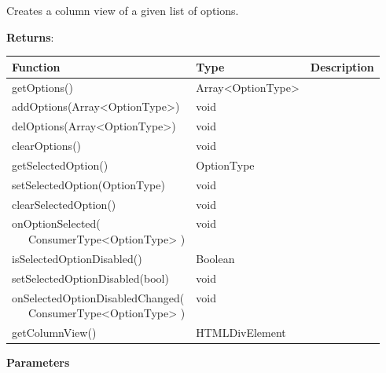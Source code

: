 \vspace*{6pt}
Creates a column view of a given list of options. 

\vspace*{18pt}
\noindent
\textbf{Returns}: 

\begin{table}[!htb] 
    \label{api:columnOptionsComponentReturn}
    \footnotesize
    \setlength\extrarowheight{4pt}
    \begin{tabular}{ p{5cm} p{3cm} p{5cm} }
        \toprule[1.2pt]
        \textbf{Function}                   & \textbf{Type}     & \textbf{Description} \\
        \midrule
        getOptions()                        & Array<OptionType> &  \\
        addOptions(Array<OptionType>)       & void              &  \\
        delOptions(Array<OptionType>)       & void              &  \\
        clearOptions()                      & void              &  \\
        getSelectedOption()                 & OptionType        &  \\
        setSelectedOption(OptionType)       & void              &  \\
        clearSelectedOption()               & void              &  \\
        \tbbr{
            onOptionSelected( \\
                \ \ \ ConsumerType<OptionType>
            )}                              & void              &  \\
        isSelectedOptionDisabled()          & Boolean           &  \\
        setSelectedOptionDisabled(bool)     & void              &  \\
        \tbbr{
            onSelectedOptionDisabledChanged( \\
                \ \ \ ConsumerType<OptionType>
            )}                              & void              &  \\
        getColumnView()                     & HTMLDivElement    &  \\
        \bottomrule[1.2pt]
    \end{tabular}
\end{table}

\vspace*{6pt}
\noindent
\textbf{Parameters}

